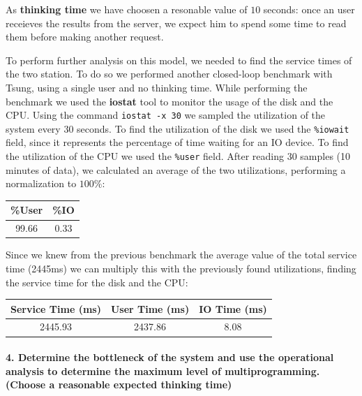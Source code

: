 \documentclass[11pt]{scrartcl} %
\begin{document}
As \textbf{thinking time} we have choosen a resonable value of $10$ seconds: once an user receieves the results from the server, we expect him to spend some time to read them before making another request.

To perform further analysis on this model, we needed to find the service times of the two station. To do so we performed another closed-loop benchmark with Tsung, using a single user and no thinking time. While performing the benchmark we used the \textbf{iostat} tool to monitor the usage of the disk and the CPU. Using the command \texttt{iostat -x 30} we sampled the utilization of the system every 30 seconds. To find the utilization of the disk we used the \texttt{\%iowait} field, since it represents the percentage of time waiting for an IO device. To find the utilization of the CPU we used the \texttt{\%user} field. After reading 30 samples (10 minutes of data), we calculated an average of the two utilizations, performing a normalization to $100\%$:

\begin{table}[H]
\centering
\begin{tabular}{c|c}
\multicolumn{1}{l|}{\%User} & \multicolumn{1}{l}{\%IO} \\ \hline
99.66	&  0.33\\
\end{tabular}
\end{table}

Since we knew from the previous benchmark the average value of the total service time (2445ms) we can multiply this with the previously found utilizations, finding the service time for the disk and the CPU:

\begin{table}[H]
\centering
\begin{tabular}{c|c|c}
\multicolumn{1}{l|}{Service Time (ms)} & \multicolumn{1}{l|}{User Time (ms)} & \multicolumn{1}{l}{IO Time (ms)} \\ \hline
2445.93	&  2437.86	&  8.08\\
\end{tabular}
\end{table}


\paragraph*{4. Determine the bottleneck of the system and use the operational analysis to determine the maximum level of multiprogramming. (Choose a reasonable expected thinking time)} \mbox{}\\\\
\end{document}

